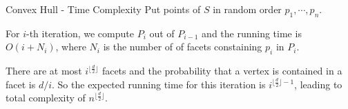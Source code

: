 \documentclass{beamer}
\begin{document}
\begin{frame}{Convex Hull - Time Complexity}
Put points of $S$ in random order $p_1, \cdots, p_n$.

\vspace{\baselineskip}

For $i$-th iteration, we compute $P_i$ out of $P_{i-1}$ and the running time is $O(i + N_i)$, where $N_i$ is the number of 
of facets constaining $p_i$ in $P_i$.

\vspace{\baselineskip}

There are at most $i^{\lfloor \frac{d}{2} \rfloor}$ facets and the probability that a vertex is contained in a facet 
is $d / i$. So the expected running time for this iteration is $i^{\lfloor \frac{d}{2} \rfloor - 1}$, leading to total complexity of $n^{\lfloor \frac{d}{2} \rfloor }$.
\end{frame}
\end{document}
